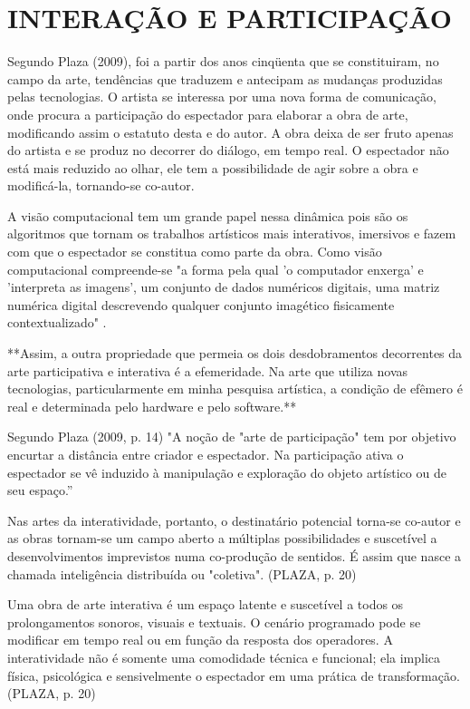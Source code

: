 \chapter{INTERAÇÃO E PARTICIPAÇÃO}

Segundo Plaza (2009), foi a partir dos anos cinqüenta que se constituiram, no campo da arte, tendências que traduzem e antecipam as mudanças produzidas pelas tecnologias. O artista se interessa por uma nova forma de comunicação, onde procura a participação do espectador para elaborar a obra de arte, modificando assim o estatuto desta e do autor. A obra deixa de ser fruto apenas do artista e se produz no decorrer do diálogo, em tempo real. O espectador não está mais reduzido ao olhar, ele tem a possibilidade de agir sobre a obra e modificá-la, tornando-se co-autor.

A visão computacional tem um grande papel nessa dinâmica pois são os algoritmos que tornam os trabalhos artísticos mais interativos, imersivos e fazem com que o espectador se constitua como parte da obra. Como visão computacional compreende-se "a forma pela qual 'o computador enxerga' e 'interpreta as imagens', um conjunto de dados numéricos digitais, uma matriz numérica digital descrevendo qualquer conjunto imagético fisicamente contextualizado" \cite[p. 134]{caetano}.
				
**Assim, a outra propriedade que permeia os dois desdobramentos decorrentes da arte participativa e interativa é a efemeridade. Na arte que utiliza novas tecnologias, particularmente em minha pesquisa artística, a condição de efêmero é real e determinada pelo hardware e pelo software.**

Segundo Plaza (2009, p. 14) "A noção de "arte de participação" tem por objetivo encurtar a distância entre criador e espectador. Na participação ativa o espectador se vê induzido à manipulação e exploração do objeto artístico ou de seu espaço.”		
							
Nas artes da interatividade, portanto, o destinatário potencial torna-se co-autor e as obras tornam-se um campo aberto a múltiplas possibilidades e suscetível a desenvolvimentos imprevistos numa co-produção de sentidos. É assim que nasce a chamada inteligência distribuída ou "coletiva". (PLAZA, p. 20)				
						
Uma obra de arte interativa é um espaço latente e suscetível a todos os prolongamentos sonoros, visuais e textuais. O cenário programado pode se modificar em tempo real ou em função da resposta dos operadores. A interatividade não é somente uma comodidade técnica e funcional; ela implica física, psicológica e sensivelmente o espectador em uma prática de transformação. (PLAZA, p. 20)


